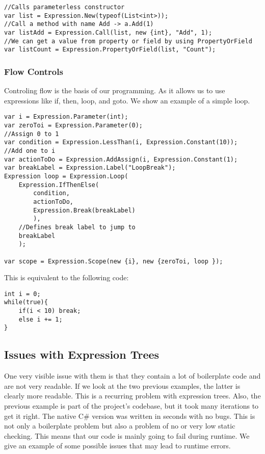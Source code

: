 \begin{lstlisting}
//Calls parameterless constructor
var list = Expression.New(typeof(List<int>));
//Call a method with name Add -> a.Add(1)
var listAdd = Expression.Call(list, new {int}, "Add", 1);
//We can get a value from property or field by using PropertyOrField
var listCount = Expression.PropertyOrField(list, "Count");
\end{lstlisting}

\subsubsection{Flow Controls}
Controling flow is the basis of our programming. As it allows us to use expressions like if, then, loop, and goto. We show an example of a simple loop. 


\begin{lstlisting}
var i = Expression.Parameter(int);
var zeroToi = Expression.Parameter(0);
//Assign 0 to 1
var condition = Expression.LessThan(i, Expression.Constant(10));
//Add one to i
var actionToDo = Expression.AddAssign(i, Expression.Constant(1);
var breakLabel = Expression.Label("LoopBreak");
Expression loop = Expression.Loop(
    Expression.IfThenElse(
        condition,
        actionToDo,
        Expression.Break(breakLabel)
        ),
    //Defines break label to jump to
    breakLabel
    );

var scope = Expression.Scope(new {i}, new {zeroToi, loop });

\end{lstlisting}

This is equivalent to the following code:
\begin{lstlisting}
int i = 0;
while(true){
    if(i < 10) break;
    else i += 1;
}
\end{lstlisting}

\subsection{Issues with Expression Trees}
One very visible issue with them is that they contain a lot of boilerplate code and are not very readable. If we look at the two previous examples, the latter is clearly more readable. This is a recurring problem with expression trees. Also, the previous example is part of the project's codebase, but it took many iterations to get it right. The native C\# version was written in seconds with no bugs. This is not only a boilerplate problem but also a problem of no or very low static checking. This means that our code is mainly going to fail during runtime. We give an example of some possible issues that may lead to runtime errors.

